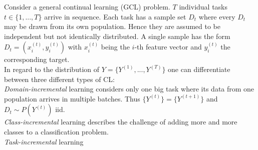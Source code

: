 Consider a general continual learning (GCL) problem. $T$ individual tasks $t \in \{1, ..., T\}$ arrive in sequence. Each task has a sample set $D_t$ where every $D_t$ may be drawn from its own population. Hence they are assumed to be independent but not identically distributed. A single sample has the form $D_t = (x^{(t)}_i,y^{(t)}_i)$ with $x^{(t)}_i$ being the $i$-th feature vector and $y^{(t)}_i$ the corresponding target.\\
In regard to the distribution of $Y = \{Y^{(1)}, ..., Y^{(T)}\}$ one can differentiate between three different types of CL:\\
\textit{Domain-incremental} learning considers only one big task where its data from one population arrives in multiple batches. Thus $\{Y^{(t)}\}=\{Y^{(t+1)}\}$ and $D_t \sim P(Y^{(t)})$ iid.\\
\textit{Class-incremental} learning describes the challenge of adding more and more classes to a classification problem. 
\\
\textit{Task-incremental} learning
